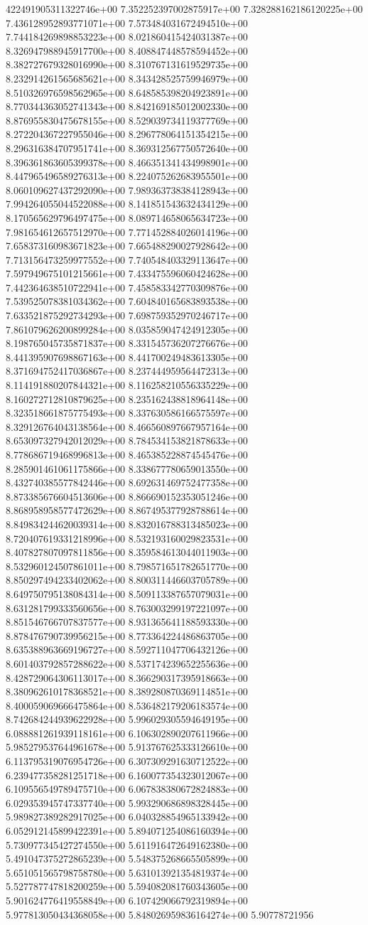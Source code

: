 422491905311322746e+00	7.352252397002875917e+00	7.328288162186120225e+00	7.436128952893771071e+00	7.573484031672494510e+00	7.744184269898853223e+00	8.021860415424031387e+00	8.326947988945917700e+00	8.408847448578594452e+00	8.382727679328016990e+00	8.310767131619529735e+00	8.232914261565685621e+00	8.343428525759946979e+00	8.510326976598562965e+00	8.648585398204923891e+00	8.770344363052741343e+00	8.842169185012002330e+00	8.876955830475678155e+00	8.529039734119377769e+00	8.272204367227955046e+00	8.296778064151354215e+00	8.296316384707951741e+00	8.369312567750572640e+00	8.396361863605399378e+00	8.466351341434998901e+00	8.447965496589276313e+00	8.224075262683955501e+00	8.060109627437292090e+00	7.989363738384128943e+00	7.994264055044522088e+00	8.141851543632434129e+00	8.170565629796497475e+00	8.089714658065634723e+00	7.981654612657512970e+00	7.771452884026014196e+00	7.658373160983671823e+00	7.665488290027928642e+00	7.713156473259977552e+00	7.740548403329113647e+00	7.597949675101215661e+00	7.433475596060424628e+00	7.442364638510722941e+00	7.458583342770309876e+00	7.539525078381034362e+00	7.604840165683893538e+00	7.633521875292734293e+00	7.698759352970246717e+00	7.861079626200899284e+00	8.035859047424912305e+00	8.198765045735871837e+00	8.331545736207276676e+00	8.441395907698867163e+00	8.441700249483613305e+00	8.371694752417036867e+00	8.237444959564472313e+00	8.114191880207844321e+00	8.116258210556335229e+00	8.160272712810879625e+00	8.235162438818964148e+00	8.323518661875775493e+00	8.337630586166575597e+00	8.329126764043138564e+00	8.466560897667957164e+00	8.653097327942012029e+00	8.784534153821878633e+00	8.778686719468996813e+00	8.465385228874545476e+00	8.285901461061175866e+00	8.338677780659013550e+00	8.432740385577842446e+00	8.692631469752477358e+00	8.873385676604513606e+00	8.866690152353051246e+00	8.868958958577472629e+00	8.867495377928788614e+00	8.849834244620039314e+00	8.832016788313485023e+00	8.720407619331218996e+00	8.532193160029823531e+00	8.407827807097811856e+00	8.359584613044011903e+00	8.532960124507861011e+00	8.798571651782651770e+00	8.850297494233402062e+00	8.800311446603705789e+00	8.649750795138084314e+00	8.509113387657079031e+00	8.631281799333560656e+00	8.763003299197221097e+00	8.851546766707837577e+00	8.931365641188593330e+00	8.878476790739956215e+00	8.773364224486863705e+00	8.635388963669196727e+00	8.592711047706432126e+00	8.601403792857288622e+00	8.537174239652255636e+00	8.428729064306113017e+00	8.366290317395918663e+00	8.380962610178368521e+00	8.389280870369114851e+00	8.400059069666475864e+00	8.536482179206183574e+00	8.742684244939622928e+00	5.996029305594649195e+00	6.088881261939118161e+00	6.106302890207611966e+00	5.985279537644961678e+00	5.913767625333126610e+00	6.113795319076954726e+00	6.307309291630712522e+00	6.239477358281251718e+00	6.160077354323012067e+00	6.109556549789475710e+00	6.067838380672824883e+00	6.029353945747337740e+00	5.993290686898328445e+00	5.989827389282917025e+00	6.040328854965133942e+00	6.052912145899422391e+00	5.894071254086160394e+00	5.730977345427274550e+00	5.611916472649162380e+00	5.491047375272865239e+00	5.548375268665505899e+00	5.651051565798758780e+00	5.631013921354819374e+00	5.527787747818200259e+00	5.594082081760343605e+00	5.901624776419558849e+00	6.107429066792319894e+00	5.977813050434368058e+00	5.848026959836164274e+00	5.90778721956